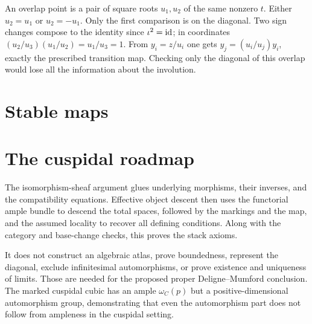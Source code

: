 An overlap point is a pair of square roots $u_1,u_2$ of the
same nonzero $t$. Either $u_2=u_1$ or $u_2=-u_1$.
Only the first comparison is on the diagonal. Two sign
changes compose to the identity since $\iota^2=\operatorname{id}$;
in coordinates $(u_2/u_3)(u_1/u_2)=u_1/u_3=1$.
From $y_i=z/u_i$ one gets
$y_j=(u_i/u_j)y_i$, exactly the prescribed transition map.
Checking only the diagonal of this overlap would lose all
the information about the involution.



\section{Stable maps}


\section{The cuspidal roadmap}
The isomorphism-sheaf argument glues underlying morphisms,
their inverses, and the compatibility equations. Effective
object descent then uses the functorial ample bundle to
descend the total spaces, followed by the markings and the
map, and the assumed locality to recover all defining
conditions. Along with the category and base-change checks,
this proves the stack axioms.

It does not construct an algebraic atlas, prove boundedness,
represent the diagonal, exclude infinitesimal automorphisms,
or prove existence and uniqueness of limits. Those are
needed for the proposed proper Deligne--Mumford conclusion.
The marked cuspidal cubic has an ample $\omega_C(p)$ but a
positive-dimensional automorphism group, demonstrating that
even the automorphism part does not follow from ampleness
in the cuspidal setting.

